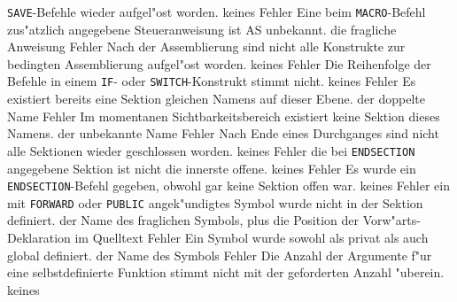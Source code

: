 \documentclass[12pt,a4paper,twoside]{report}
\newcommand{\tty}[1]{{\tt #1}}
\begin{document}
\begin{description}
{                \tty{SAVE}-Befehle wieder aufgel"ost worden.}
               {keines}
               {Fehler}
               {Eine beim \tty{MACRO}-Befehl zus"atzlich angegebene
                Steueranweisung ist AS unbekannt.}
               {die fragliche Anweisung}
               {Fehler}
               {Nach der Assemblierung sind nicht alle
                Konstrukte zur bedingten Assemblierung aufgel"ost
                worden.}
               {keines}
               {Fehler}
               {Die Reihenfolge der Befehle in einem \tty{IF}-
	        oder \tty{SWITCH}-Konstrukt stimmt nicht.}
               {keines}
               {Fehler}
               {Es existiert bereits eine Sektion gleichen
                Namens auf dieser Ebene.}
               {der doppelte Name}
               {Fehler}
               {Im momentanen Sichtbarkeitsbereich existiert
                keine Sektion dieses Namens.}
               {der unbekannte Name}
               {Fehler}
               {Nach Ende eines Durchganges sind nicht alle
                Sektionen wieder geschlossen worden.}
               {keines}
               {Fehler}
               {die bei \tty{ENDSECTION} angegebene Sektion
	        ist nicht die innerste offene.}
               {keines}
               {Fehler}
               {Es wurde ein \tty{ENDSECTION}-Befehl gegeben, obwohl
                gar keine Sektion offen war.}
               {keines}
               {Fehler}
               {ein mit \tty{FORWARD} oder \tty{PUBLIC}
	        angek"undigtes Symbol wurde nicht in der Sektion definiert.}
               {der Name des fraglichen Symbols, plus die
                Position der Vorw"arts-Deklaration im Quelltext}
               {Fehler}
               {Ein Symbol wurde sowohl als privat als auch
                global definiert.}
               {der Name des Symbols}
               {Fehler}
               {Die Anzahl der Argumente f"ur eine
                selbstdefinierte Funktion stimmt nicht mit der geforderten
                Anzahl "uberein.}
               {keines}

\end{description}
\end{document}
